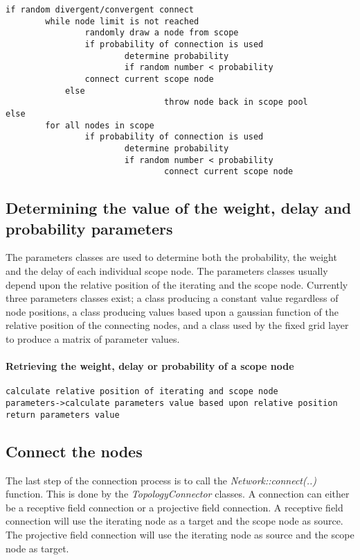 \documentclass{article}
\begin{document}
\begin{verbatim}
if random divergent/convergent connect
        while node limit is not reached
                randomly draw a node from scope
                if probability of connection is used
                        determine probability
                        if random number < probability
				connect current scope node
			else
                                throw node back in scope pool
else			
        for all nodes in scope
                if probability of connection is used
                        determine probability
                        if random number < probability
                                connect current scope node
\end{verbatim}

\subsection{Determining the value of the weight, delay and probability parameters}

The parameters classes are used to determine both the probability, the weight and the delay of each individual scope node. The parameters classes usually depend upon the relative position of the iterating and the scope node. Currently three parameters classes exist; a class producing a constant value regardless of node positions, a class producing values based upon a gaussian function of the relative position of the connecting nodes, and a class used by the fixed grid layer to produce a matrix of parameter values.

\paragraph{Retrieving the weight, delay or probability of a scope node}
\begin{verbatim}
calculate relative position of iterating and scope node
parameters->calculate parameters value based upon relative position
return parameters value
\end{verbatim}

\subsection{Connect the nodes}

The last step of the connection process is to call the \emph{Network::connect(..)} function. This is done by the \emph{TopologyConnector} classes. A connection can either be a receptive field connection or a projective field connection. A receptive field connection will use the iterating node as a target and the scope node as source. The projective field connection will use the iterating node as source and the scope node as target.
\end{document}
